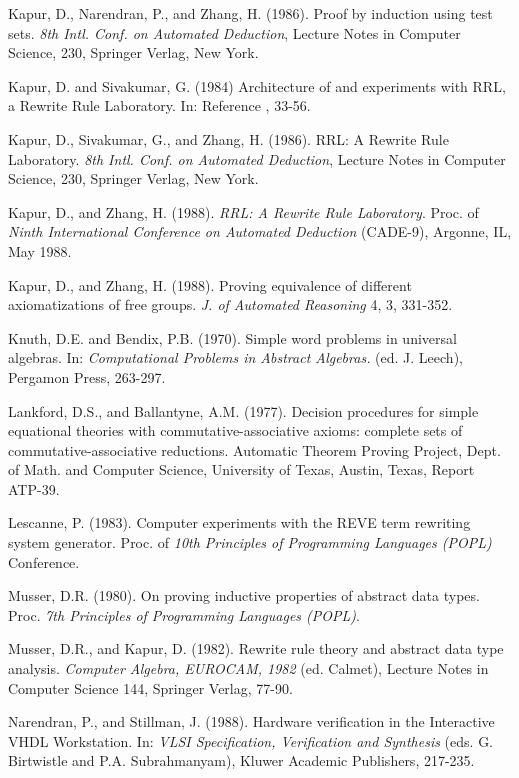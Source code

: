 \begin{thebibliography}{99}
Kapur, D., Narendran, P., and Zhang, H. (1986). Proof
by induction using test sets. {\em 8th Intl. Conf. on Automated
Deduction}, Lecture Notes in Computer Science, 230, Springer Verlag, 
New York.

Kapur, D. and Sivakumar, G. (1984) Architecture of
and experiments with RRL, a Rewrite Rule Laboratory. In: Reference
\cite{Guttagetal84}, 33-56.

Kapur, D., Sivakumar, G., and Zhang, H. (1986). RRL: A
Rewrite Rule Laboratory. {\em 8th Intl. Conf. on Automated Deduction},
Lecture Notes in Computer Science, 230, Springer Verlag, New York.

 Kapur, D., and Zhang, H. (1988).
{\em RRL: A Rewrite Rule Laboratory}.  Proc. of {\em Ninth
International Conference on Automated Deduction} (CADE-9), Argonne,
IL, May 1988.

 Kapur, D., and Zhang, H. (1988). Proving equivalence of 
different axiomatizations of free groups.  {\em J. of Automated
Reasoning} 4, 3, 331-352.

Knuth, D.E. and Bendix, P.B. (1970). Simple word
problems in universal algebras.  In: {\em Computational Problems in
Abstract Algebras.} (ed. J.  Leech), Pergamon Press, 263-297.

Lankford, D.S., and Ballantyne, A.M.
(1977). Decision procedures for simple equational theories with
commutative-associative axioms: complete sets of
commutative-associative reductions. Automatic Theorem Proving Project,
Dept. of Math. and Computer Science, University of Texas, Austin,
Texas, Report ATP-39.

Lescanne, P. (1983). Computer experiments with the
REVE term rewriting system generator. Proc. of {\em 10th Principles of
Programming Languages (POPL)} Conference.

Musser, D.R. (1980). On proving inductive
properties of abstract data types. Proc. {\em 7th Principles of
Programming Languages (POPL)}.

Musser, D.R., and Kapur, D. (1982). Rewrite rule
theory and abstract data type analysis. {\em Computer Algebra,
EUROCAM, 1982} (ed. Calmet), Lecture Notes in Computer Science 144,
Springer Verlag, 77-90.

 Narendran, P., and Stillman, J. (1988). 
Hardware verification in the 
Interactive VHDL Workstation. In: {\em VLSI Specification, Verification 
and Synthesis } (eds. G. Birtwistle and P.A. Subrahmanyam), Kluwer 
Academic Publishers, 217-235.


\end{thebibliography}
